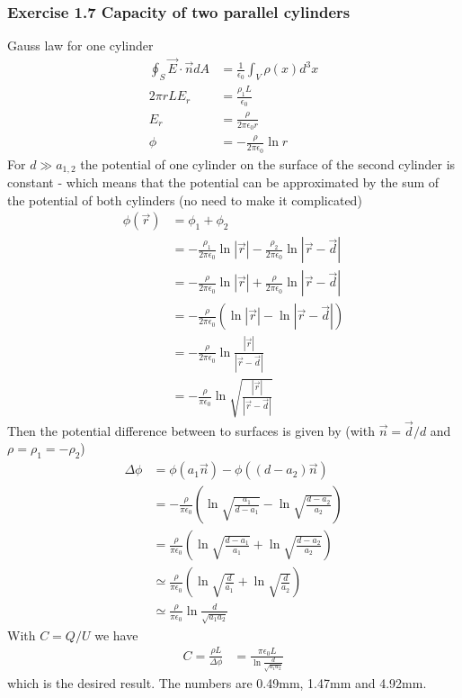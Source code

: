 \documentclass[10pt,a4paper]{book}
\theoremstyle{definition}
\begin{document}
\subsubsection{Exercise 1.7 Capacity of two parallel cylinders}Gauss law for one cylinder
\begin{align}
\oint_S\vec{E}\cdot\vec{n}dA&=\frac{1}{\epsilon_0}\int_V\rho(x)d^3x\\
2\pi rLE_r&=\frac{\rho_{1} L}{\epsilon_0}\\
E_r&=\frac{\rho}{2\pi\epsilon_0r}\\
\phi&=-\frac{\rho}{2\pi\epsilon_0}\ln r
\end{align}
For $d\gg a_{1,2}$ the potential of one cylinder on the surface of the second cylinder is constant - which means that the potential can be approximated by the sum of the potential of both cylinders (no need to make it complicated)
\begin{align}
\phi(\vec{r})&=\phi_1+\phi_2\\
&=-\frac{\rho_{1}}{2\pi\epsilon_0}\ln |\vec{r}|-\frac{\rho_{2}}{2\pi\epsilon_0}\ln |\vec{r}-\vec{d}|\\
&=-\frac{\rho}{2\pi\epsilon_0}\ln |\vec{r}|+\frac{\rho}{2\pi\epsilon_0}\ln |\vec{r}-\vec{d}|\\
&=-\frac{\rho}{2\pi\epsilon_0}\left(\ln |\vec{r}|-\ln |\vec{r}-\vec{d}|\right)\\
&=-\frac{\rho}{2\pi\epsilon_0}\ln \frac{|\vec{r}|}{|\vec{r}-\vec{d}|}\\
&=-\frac{\rho}{\pi\epsilon_0}\ln \sqrt{\frac{|\vec{r}|}{|\vec{r}-\vec{d}|}}
\end{align}
Then the potential difference between to surfaces is given by (with $\vec{n}=\vec{d}/d$ and $\rho=\rho_1=-\rho_2$)
\begin{align}
\Delta\phi&=\phi(a_1\vec{n})-\phi((d-a_2)\vec{n})\\
&=-\frac{\rho}{\pi\epsilon_0}\left(\ln \sqrt{\frac{a_1}{d-a_1}}-\ln \sqrt{\frac{d-a_2}{a_2}}\right)\\
&=\frac{\rho}{\pi\epsilon_0}\left(\ln \sqrt{\frac{d-a_1}{a_1}}+\ln \sqrt{\frac{d-a_2}{a_2}}\right)\\
&\simeq\frac{\rho}{\pi\epsilon_0}\left(\ln \sqrt{\frac{d}{a_1}}+\ln \sqrt{\frac{d}{a_2}}\right)\\
&\simeq\frac{\rho}{\pi\epsilon_0}\ln \frac{d}{\sqrt{a_1a_2}}
\end{align}
With $C=Q/U$ we have
\begin{align}
C=\frac{\rho L}{\Delta\phi}&=\frac{\pi\epsilon_0L}{\ln \frac{d}{\sqrt{a_1a_2}}}
\end{align}
which is the desired result. The numbers are 0.49mm, 1.47mm and 4.92mm.
\end{document}
